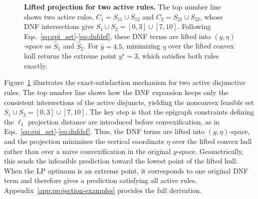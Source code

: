 \documentclass{article}
\theoremstyle{plain}
\theoremstyle{definition}
\theoremstyle{remark}
\begin{document}
\begin{figure}[t]

\caption{
\textbf{Lifted projection for two active rules.}
The top number line shows two active rules,
\(C_1=S_{11}\cup S_{12}\) and \(C_2=S_{21}\cup S_{22}\), whose DNF intersections give
\(S_1\cup S_2=[0,3]\cup[7,10]\).
Following Eqs.~\eqref{eq:epi_set}-\eqref{eq:dnfdef}, these DNF terms are lifted into \((y,\eta)\)-space as \(\widehat S_1\) and \(\widehat S_2\).
For \(\hat y=4.5\), minimizing \(\eta\) over the lifted convex hull returns the extreme point \(y^\star=3\), which satisfies both rules exactly.
}
\label{fig:lifted_dnf_example}

\end{figure}

Figure~\ref{fig:lifted_dnf_example} illustrates the exact-satisfaction mechanism for two active disjunctive rules. The top number line shows how the DNF expansion keeps only the consistent intersections of the active disjuncts, yielding the nonconvex feasible set \(S_1\cup S_2=[0,3]\cup[7,10]\). The key step is that the epigraph constraints defining the \(\ell_1\) projection distance are introduced before convexification, as in Eqs.~\eqref{eq:epi_set}-\eqref{eq:dnfdef}. Thus, the DNF terms are lifted into \((y,\eta)\)-space, and the projection minimizes the vertical coordinate \(\eta\) over the lifted convex hull rather than over a naive convexification in the original \(y\)-space. Geometrically, this sends the infeasible prediction toward the lowest point of the lifted hull. When the LP optimum is an extreme point, it corresponds to one original DNF term and therefore gives a prediction satisfying all active rules. Appendix~\ref{app:projection-examples} provides the full derivation.
\end{document}

